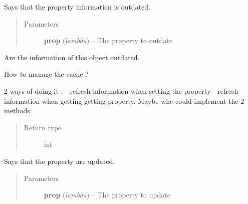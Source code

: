 \documentclass[letterpaper,10pt,english]{sphinxmanual}
\begin{document}
\begin{fulllineitems}
\begin{fulllineitems}
\end{fulllineitems}


\begin{fulllineitems}
\label{object:openzwave.object.ZWaveObject.outdate}
Says that the property information is outdated.
\begin{quote}\begin{description}
\item[{Parameters}] \leavevmode
\textbf{prop} (\emph{lambda}) -- The property to outdate

\end{description}\end{quote}

\end{fulllineitems}


\begin{fulllineitems}
\label{object:openzwave.object.ZWaveObject.outdated}
Are the information of this object outdated.

How to manage the cache ?

2 ways of doing it :
- refresh information when setting the property
- refresh information when getting getting property.
Maybe whe could implement the 2 methods.
\begin{quote}\begin{description}
\item[{Return type}] \leavevmode
int

\end{description}\end{quote}

\end{fulllineitems}


\begin{fulllineitems}
\label{object:openzwave.object.ZWaveObject.update}
Says that the property are updated.
\begin{quote}\begin{description}
\item[{Parameters}] \leavevmode
\textbf{prop} (\emph{lambda}) -- The property to update


\end{description}
\end{quote}
\end{fulllineitems}
\end{fulllineitems}
\end{document}
